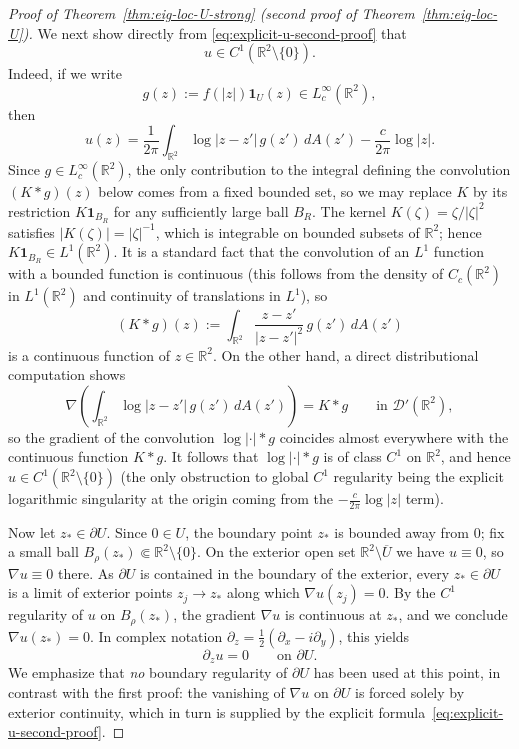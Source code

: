 \documentclass[a4paper,11pt,reqno]{amsart}
\numberwithin{equation}{section}
\theoremstyle{plain} %
\theoremstyle{definition} %
\theoremstyle{remark}
\newcommand{\R}{\mathbb{R}}
\begin{document}
\begin{proof}[Proof of Theorem~\ref{thm:eig-loc-U-strong} (second proof of Theorem~\ref{thm:eig-loc-U})]
We next show directly from \eqref{eq:explicit-u-second-proof} that
\[
u\in C^1(\R^2\setminus\{0\}).
\]
Indeed, if we write
\[
g(z):=f(|z|)\mathbf{1}_U(z)\in L^\infty_c(\R^2),
\]
then
\[
u(z)=\frac{1}{2\pi}\int_{\R^2}\log|z-z'|\,g(z')\,dA(z')-\frac{c}{2\pi}\log|z|.
\]
Since \(g\in L^\infty_c(\R^2)\), the only contribution to the integral defining the convolution
\((K\ast g)(z)\) below comes from a fixed bounded set, so we may replace \(K\) by its restriction
\(K\mathbf{1}_{B_R}\) for any sufficiently large ball \(B_R\). The kernel
\(K(\zeta)=\zeta/|\zeta|^2\) satisfies \(|K(\zeta)|=|\zeta|^{-1}\), which is integrable on bounded
subsets of \(\R^2\); hence \(K\mathbf{1}_{B_R}\in L^1(\R^2)\). It is a standard fact
that the convolution of an \(L^1\) function with a bounded function is continuous
(this follows from the density of \(C_c(\R^2)\) in \(L^1(\R^2)\) and continuity of translations in
\(L^1\)), so
\[
(K\ast g)(z):=\int_{\R^2}\frac{z-z'}{|z-z'|^2}\,g(z')\,dA(z')
\]
is a continuous function of \(z\in\R^2\). On the other hand, a direct distributional computation
shows
\[
\nabla\!\left(\int_{\R^2}\log|z-z'|\,g(z')\,dA(z')\right)=K\ast g
\qquad\text{in }\mathcal D'(\R^2),
\]
so the gradient of the convolution \(\log|\cdot|\ast g\) coincides almost everywhere with the
continuous function \(K\ast g\). It follows that \(\log|\cdot|\ast g\) is of class \(C^1\) on
\(\R^2\), and hence \(u\in C^1(\R^2\setminus\{0\})\) (the only obstruction to global \(C^1\)
regularity being the explicit logarithmic singularity at the origin coming from the
\(-\frac{c}{2\pi}\log|z|\) term).

Now let \(z_*\in\partial U\). Since \(0\in U\), the boundary point \(z_*\) is bounded away from
\(0\); fix a small ball \(B_\rho(z_*)\Subset \R^2\setminus\{0\}\). On the exterior open set
\(\R^2\setminus \overline U\) we have \(u\equiv 0\), so \(\nabla u\equiv 0\) there. As
\(\partial U\) is contained in the boundary of the exterior, every \(z_*\in\partial U\) is a limit
of exterior points \(z_j\to z_*\) along which \(\nabla u(z_j)=0\). By the \(C^1\) regularity of
\(u\) on \(B_\rho(z_*)\), the gradient \(\nabla u\) is continuous at \(z_*\), and we conclude
\(\nabla u(z_*)=0\). In complex notation \(\partial_z=\tfrac{1}{2}(\partial_x-i\partial_y)\), this
yields
\begin{equation}\label{eq:dz-zero-second-proof}
\partial_z u=0
\qquad\text{on }\partial U.
\end{equation}
We emphasize that \emph{no} boundary regularity of \(\partial U\) has been used at this point, in
contrast with the first proof: the vanishing of \(\nabla u\) on \(\partial U\) is forced solely by
exterior continuity, which in turn is supplied by the explicit
formula~\eqref{eq:explicit-u-second-proof}.


\end{proof}
\end{document}
